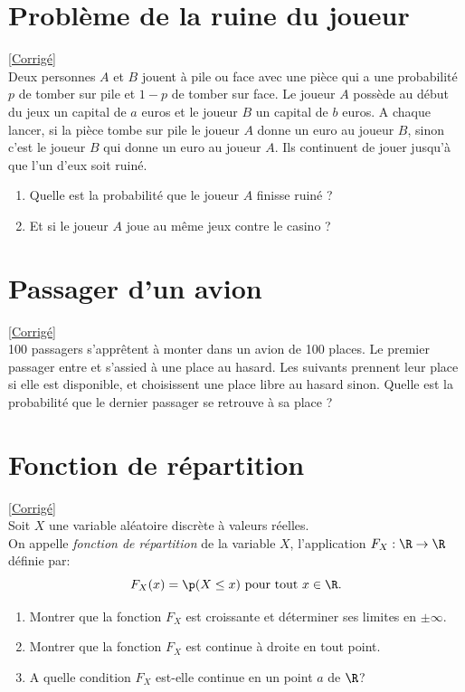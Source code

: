 \documentclass[8pt]{book}
\begin{document}
\section{Problème de la ruine du joueur}
\label{Problème de la ruine du joueur}
\textcolor{blue}{\hyperref[Problème de la ruine du joueur corrigé]{[Corrigé]}}\\
Deux personnes $A$ et $B$ jouent à pile ou face avec une pièce qui a une probabilité $p$ de tomber sur pile et $1-p$ de tomber sur face. Le joueur $A$ possède au début du jeux un capital de $a$ euros et le joueur $B$ un capital de $b$ euros. A chaque lancer, si la pièce tombe sur pile le joueur $A$ donne un euro au joueur $B$, sinon c'est le joueur $B$ qui donne un euro au joueur $A$. Ils continuent de jouer jusqu'à que l'un d'eux soit ruiné.
\begin{enumerate}
	\item Quelle est la probabilité que le joueur $A$ finisse ruiné ?
	\item Et si le joueur $A$ joue au même jeux contre le casino ?
\end{enumerate}

\section{Passager d'un avion}
\label{Passager d'un avion}
\textcolor{blue}{\hyperref[Passager d'un avion corrigé]{[Corrigé]}}\\
100 passagers s'apprêtent à monter dans un avion de 100 places. Le premier passager entre et s'assied à une place au hasard. Les suivants prennent leur place si elle est disponible, et choisissent une place libre au hasard sinon. Quelle est la probabilité que le dernier passager se retrouve à sa place ?

\section{Fonction de répartition }
\label{Fonction de répartition}
\textcolor{blue}{\hyperref[Fonction de répartition corrigé]{[Corrigé]}}\\
Soit $X$ une variable aléatoire discrète à valeurs réelles.
\\On appelle \textit{fonction de répartition} de la variable $X$, l'application $F_X:\R\to\R$ définie par: $$F_X(x)=\p(X\leq x) \ \text{pour tout } x\in\R.$$
\begin{enumerate}
	\item Montrer que la fonction $F_X$ est croissante et déterminer ses limites en $\pm \infty$.
	\item Montrer que la fonction $F_X$ est continue à droite en tout point.
	\item A quelle condition $F_X$ est-elle continue en un point $a$ de $\R$?
\end{enumerate}
\end{document}
